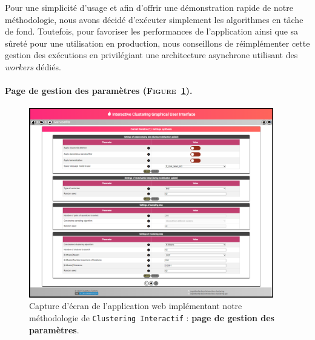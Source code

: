 			\begin{leftBarWarning}
				Pour une simplicité d'usage et afin d'offrir une démonstration rapide de notre méthodologie, nous avons décidé d'exécuter simplement les algorithmes en tâche de fond.
				Toutefois, pour favoriser les performances de l'application ainsi que sa sûreté pour une utilisation en production, nous conseillons de réimplémenter cette gestion des exécutions en privilégiant une architecture asynchrone utilisant des \textit{workers} dédiés.
			\end{leftBarWarning}
		
		
		\paragraph{Page de gestion des paramètres (\textsc{Figure~\ref{figure:C-WEB-APPLICATION-PARAMETRAGE}}).}
		
			\begin{figure}[H]
				\centering
				\includegraphics[width=0.95\textwidth]{figures/interactive-clustering-application-parametres}
				\caption{
					Capture d'écran de l'application web implémentant notre méthodologie de \texttt{Clustering Interactif} : \textbf{page de gestion des paramètres}.
				}
				\label{figure:C-WEB-APPLICATION-PARAMETRAGE}
			\end{figure}
			
